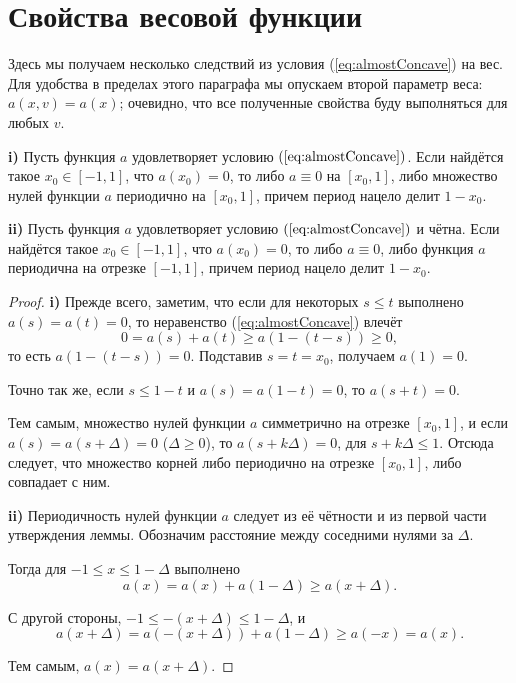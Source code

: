 \section{Свойства весовой функции}
\label{sec:weight_properties}

Здесь мы получаем несколько следствий из условия (\ref{eq:almostConcave}) на вес.
Для удобства в пределах этого параграфа мы опускаем второй параметр веса: $a(x, v) = a(x)$;
очевидно, что все полученные свойства буду выполняться для любых $v$.

\begin{lm}
\label{lm:weight_periodicity}
\textbf{\textup{i)}}
Пусть функция $a$ удовлетворяет условию $(\ref{eq:almostConcave})$.
Если найдётся такое $x_0 \in [-1, 1]$, что $a(x_0) = 0$,
то либо $a \equiv 0$ на $[x_0, 1]$,
либо множество нулей функции $a$ периодично на $[x_0, 1]$, причем период нацело делит $1 - x_0$.

\textbf{\textup{ii)}}
Пусть функция $a$ удовлетворяет условию $(\ref{eq:almostConcave})$ и чётна.
Если найдётся такое $x_0 \in [-1, 1]$, что $a(x_0) = 0$,
то либо $a \equiv 0$,
либо функция $a$ периодична на отрезке $[-1, 1]$, причем период нацело делит $1 - x_0$.
\end{lm}

\begin{proof}
\textbf{\textup{i)}}
Прежде всего, заметим, что если для некоторых $s \le t$ выполнено $a(s) = a(t) = 0$,
то неравенство (\ref{eq:almostConcave}) влечёт
$$
0 = a(s) + a(t) \ge a(1 - (t - s)) \ge 0,
$$
то есть $a(1 - (t - s)) = 0$.
Подставив $s = t = x_0$, получаем $a(1) = 0$.

Точно так же, если $s \le 1 - t$ и $a(s) = a(1 - t) = 0$, то $a(s + t) = 0$.

Тем самым, множество нулей функции $a$ симметрично на отрезке $[x_0, 1]$,
и если $a(s) = a(s + \Delta) = 0$ ($\Delta \ge 0$),
то $a(s + k\Delta) = 0$, для $s + k\Delta \le 1$.
Отсюда следует, что множество корней либо периодично на отрезке $[x_0, 1]$, либо совпадает с ним.

\textbf{\textup{ii)}}
Периодичность нулей функции $a$ следует из её чётности и из первой части утверждения леммы.
Обозначим расстояние между соседними нулями за $\Delta$.

Тогда для $-1 \le x \le 1 - \Delta$ выполнено
$$
a(x) = a(x) + a(1 - \Delta) \ge a(x + \Delta).
$$

С другой стороны, $-1 \le -(x + \Delta) \le 1 - \Delta$, и
$$
a(x + \Delta) = a(-(x + \Delta)) + a(1 - \Delta) \ge a(-x) = a(x).
$$

Тем самым, $a(x) = a(x + \Delta)$.
\end{proof}

